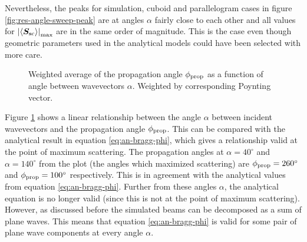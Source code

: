 \documentclass[11pt,twoside]{eitExjobb}
\begin{document}
	Nevertheless, the peaks for simulation, cuboid and parallelogram cases in figure \ref{fig:res-angle-sweep-peak} are at angles $\alpha$ fairly close to each other and all values for $\left| \left< \bm{S}_{\mathrm{sc}} \right> \right|_{\mathrm{max}}$ are in the same order of magnitude. This is the case even though geometric parameters used in the analytical models could have been selected with more care. 
	
	\begin{figure}[H]
		\centering
		\begin{subfigure}{\textwidth}
			\resizebox{\textwidth}{!}{
				
			}
		\end{subfigure}
		\begin{subfigure}{\textwidth}
			\resizebox{\textwidth}{!}{
				
			}
		\end{subfigure}
		\caption{\label{fig:res-angle-sweep-angles} Weighted average of the propagation angle $\phi_{\mathrm{prop}}$ as a function of angle between wavevectors $\alpha$. Weighted by corresponding Poynting vector.}
	\end{figure}
	Figure \ref{fig:res-angle-sweep-angles} shows a linear relationship between the angle $\alpha$ between incident wavevectors and the propagation angle $\phi_{\mathrm{prop}}$. This can be compared with the analytical result in equation \eqref{eq:an-bragg-phi}, which gives a relationship valid at the point of maximum scattering. The propagation angles at $\alpha = 40^\circ$ and $\alpha = 140^\circ$ from the plot (the angles which maximized scattering) are $\phi_{\mathrm{prop}} = 260^\circ$ and $\phi_{\mathrm{prop}} = 100^\circ$ respectively. This is in agreement with the analytical values from equation \eqref{eq:an-bragg-phi}. Further from these angles $\alpha$, the analytical equation is no longer valid (since this is not at the point of maximum scattering). However, as discussed before the simulated beams can be decomposed as a sum of plane waves. This means that equation \eqref{eq:an-bragg-phi} is valid for some pair of plane wave components at every angle $\alpha$.
	
	
\end{document}
